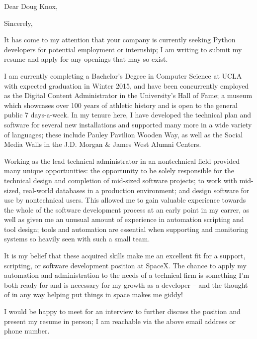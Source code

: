 \date{September 17, 2015}
\opening{Dear Doug Knox,}
\closing{Sincerely,}
\makelettertitle

It has come to my attention that your company is currently seeking Python developers for potential employment or internship; I am writing to submit my resume and apply for any openings that may so exist. 

I am currently completing a Bachelor's Degree in Computer Science at UCLA with expected graduation in Winter 2015, and have been concurrently employed as the Digital Content Administrator in the University's Hall of Fame; a museum which showcases over 100 years of athletic history and is open to the general public 7 days-a-week. In my tenure here, I have developed the technical plan and software for several new installations and supported many more in a wide variety of languages; these include Pauley Pavilion Wooden Way, as well as the Social Media Walls in the J.D. Morgan \& James West Alumni Centers.

Working as the lead technical administrator in an nontechnical field provided many unique opportunities: the opportunity to be solely responsible for the technical design and completion of mid-sized software projects; to work with mid-sized, real-world databases in a production environment; and design software for use by nontechnical users. This allowed me to gain valuable experience towards the whole of the software development process at an early point in my carrer, as well as given me an unusual amount of experience in automation scripting and tool design; tools and automation are essential when supporting and monitoring systems so heavily seen with such a small team.

It is my belief that these acquired skills make me an excellent fit for a support, scripting, or software development position at SpaceX. The chance to apply my automation and administration to the needs of a technical firm is something I'm both ready for and is necessary for my growth as a developer -- and the thought of in any way helping put things in space makes me giddy!

I would be happy to meet for an interview to further discuss the position and present my resume in person; I am reachable via the above email address or phone number.

\makeletterclosing